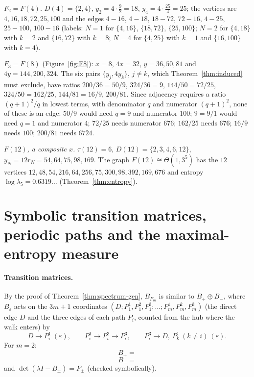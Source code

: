 \begin{example}\label{ex:small}
\emph{$F_2=F(4)$.} $D(4)=\{2,4\}$, $y_2=4\cdot\tfrac92=18$, $y_4=4\cdot\tfrac{25}4=25$; the vertices are $4,16,18,72,25,100$ and the edges $4\!-\!16$, $4\!-\!18$, $18\!-\!72$, $72\!-\!16$, $4\!-\!25$, $25\!-\!100$, $100\!-\!16$ (labels: $N=1$ for $\{4,16\}$, $\{18,72\}$, $\{25,100\}$; $N=2$ for $\{4,18\}$ with $k=2$ and $\{16,72\}$ with $k=8$; $N=4$ for $\{4,25\}$ with $k=1$ and $\{16,100\}$ with $k=4$).

\emph{$F_3=F(8)$} (Figure~\ref{fig:F8}): $x=8$, $4x=32$, $y=36,50,81$ and $4y=144,200,324$. The six pairs $\{y_j,4y_k\}$, $j\ne k$, which Theorem~\ref{thm:induced} must exclude, have ratios $200/36=50/9$, $324/36=9$, $144/50=72/25$, $324/50=162/25$, $144/81=16/9$, $200/81$. Since adjacency requires a ratio $(q+1)^2/q$ in lowest terms, with denominator $q$ and numerator $(q+1)^2$, none of these is an edge: $50/9$ would need $q=9$ and numerator $100$; $9=9/1$ would need $q=1$ and numerator $4$; $72/25$ needs numerator $676$; $162/25$ needs $676$; $16/9$ needs $100$; $200/81$ needs $6724$.

\emph{$F(12)$, a composite $x$.} $\tau(12)=6$, $D(12)=\{2,3,4,6,12\}$, $y_N=12r_N=54,64,75,98,169$. The graph $F(12)\cong\Theta(1,3^5)$ has the $12$ vertices $12,48,54,216,64,256,75,300,98,392,169,676$ and entropy $\log\lambda_5=0.6319\ldots$ (Theorem~\ref{thm:entropy}).
\end{example}

\section{Symbolic transition matrices, periodic paths and the maximal-entropy measure}\label{sec:symbolic}

\paragraph{Transition matrices.}
By the proof of Theorem~\ref{thm:spectrum-gen}, $B_{F_m}$ is similar to $B_+\oplus B_-$, where $B_\varepsilon$ acts on the $3m+1$ coordinates $(D;P_1^1,P_1^2,P_1^3;\dots;P_m^1,P_m^2,P_m^3)$ (the direct edge $D$ and the three edges of each path $P_i$, counted from the hub where the walk enters) by
\[
D\to P_i^1\ (\varepsilon),\qquad P_i^1\to P_i^2\to P_i^3,\qquad P_i^3\to D,\ P_k^1\ (k\ne i)\ (\varepsilon).
\]
For $m=2$:
\[
B_+=
\]
\[
B_-=
\]
and $\det(\lambda I-B_\pm)=P_\pm$ (checked symbolically).

